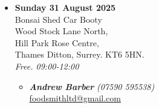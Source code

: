 \begin{itemize}

    \item \textbf{Sunday 31 August 2025}
    \\
    Bonsai Shed Car Booty \\
    Wood Stock Lane North, \\
    Hill Park Rose Centre, \\
    Thames Ditton, Surrey. KT6 5HN.
    \\
    \emph{Free. 09:00-12:00}
    \begin{itemize}
        \item \textbf{\emph{Andrew Barber}} \emph{(07590 595538)} \\
        \href{mailto:foodsmithltd@gmail.com}{foodsmithltd@gmail.com} 
    \end{itemize}


\end{itemize}
